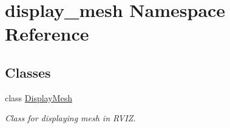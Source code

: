 \hypertarget{namespacedisplay__mesh}{}\section{display\+\_\+mesh Namespace Reference}
\label{namespacedisplay__mesh}
\subsection*{Classes}
\begin{DoxyCompactItemize}
\item 
class \hyperlink{classdisplay__mesh_1_1_display_mesh}{Display\+Mesh}
\begin{DoxyCompactList}\small\item\em Class for displaying mesh in R\+V\+IZ. \end{DoxyCompactList}\end{DoxyCompactItemize}
